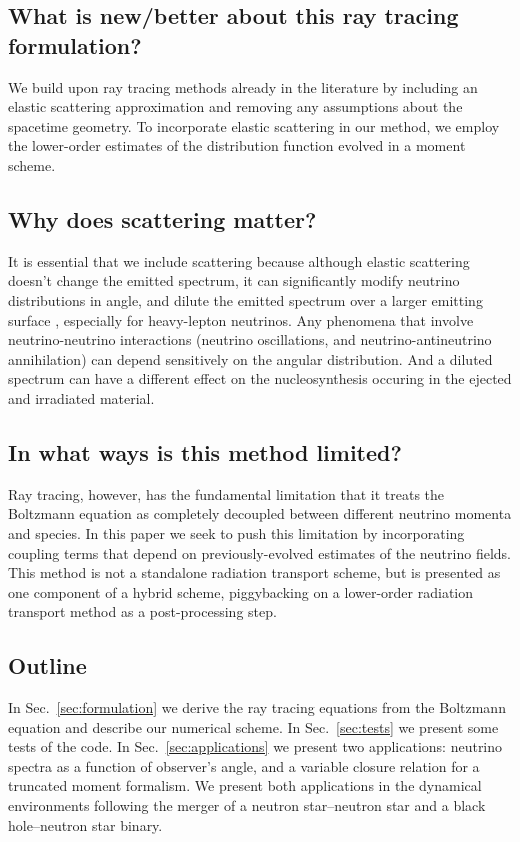 \documentclass[aps,prd,twocolumn,superscriptaddress,groupedaddress]{revtex4}
\newcommand{\todo}[1]{\marginpar{\tiny{\textcolor{red}{#1}}}}
\begin{document}
\subsection{What is new/better about this ray tracing formulation?}
We build upon ray tracing methods already in the literature
\citep{hari2010-nunubar_gr, ?}
by including an elastic scattering approximation
\todo{and perhaps inelastic}
and removing any assumptions about the spacetime geometry.
To incorporate elastic scattering in our method, we employ the lower-order
estimates of the distribution function evolved in a moment scheme.

\subsection{Why does scattering matter?}
It is essential that we include scattering because although elastic scattering
doesn't change the emitted spectrum, it can significantly modify neutrino
distributions in angle, and dilute the emitted spectrum over a larger emitting
surface \citep{yonglin_collab}, especially for heavy-lepton neutrinos.
Any phenomena that involve neutrino-neutrino interactions (neutrino oscillations,
and neutrino-antineutrino annihilation) can depend sensitively on the angular
distribution.
And a diluted spectrum can have a different effect on the nucleosynthesis
occuring in the ejected and irradiated material.

\subsection{In what ways is this method limited?}
Ray tracing, however, has the fundamental limitation that it treats the
Boltzmann equation as completely decoupled between different neutrino momenta
and species. In this paper we seek to push this limitation by incorporating
coupling terms that depend on previously-evolved estimates of the neutrino
fields. This method is not a standalone radiation transport scheme, but
is presented as one component of a  hybrid scheme, piggybacking on a
lower-order radiation transport method as a post-processing step.

\subsection{Outline}
In Sec.~\ref{sec:formulation} we derive the ray tracing equations from the
Boltzmann equation and describe our numerical scheme.
In Sec.~\ref{sec:tests} we present some tests of the code.
In Sec.~\ref{sec:applications} we present two applications:
neutrino spectra as a function of observer's angle, and
a variable closure relation for a truncated moment formalism.
We present both applications in the dynamical environments following the merger
of a neutron star--neutron star and a black hole--neutron star binary.
\end{document}
